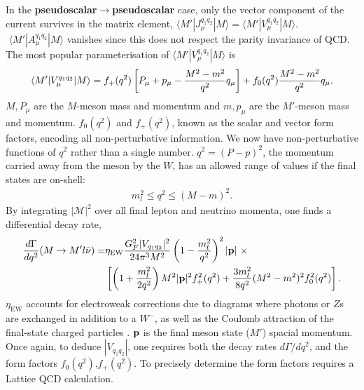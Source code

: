 In the {\bf{pseudoscalar$\to$pseudoscalar}} case, only the vector component of the current survives in the matrix element, $\langle M' | J_{\mu}^{q_1q_2} | M \rangle = \langle M' | V_{\mu}^{q_1q_2} | M \rangle$. $\,\,\langle M' | A_{\mu}^{q_1q_2} | M \rangle$ vanishes since this does not respect the parity invariance of QCD. The most popular parameterisation of $\langle M' | V_{\mu}^{q_1q_2} | M \rangle$ is
\begin{align}
  \langle M' | V_{\mu}^{q_1q_2} | M \rangle = f_+(q^2) \left[ P_{\mu} + p_{\mu} - {M^2-m^2\over q^2} q_{\mu} \right]  + f_0(q^2) {M^2-m^2\over q^2} q_{\mu}.
  \label{eq:formfactors_experimental}
\end{align}
$M,P_{\mu}$ are the $M$-meson mass and momentum and $m,p_{\mu}$ are the $M'$-meson mass and momentum. $f_0(q^2)$ and $f_+(q^2)$, known as the scalar and vector form factors, encoding all non-perturbative information. We now have non-perturbative functions of $q^2$ rather than a single number. $q^2=(P-p)^2$, the momentum carried away from the meson by the $W$, has an allowed range of values if the final states are on-shell:
\begin{align}
  m_l^2 \leq q^2 \leq (M-m)^2.
\end{align}
By integrating $|\mathcal{M}|^2$ over all final lepton and neutrino momenta, one finds a differential decay rate,
\begin{align}
  {d\Gamma\over dq^2}(M\to M'l\bar{\nu}) =& \eta_{\text{EW}} { G_F^2 |V_{q_1q_2}|^2\over 24 \pi^3 M^2 } \left( 1 - {m_l^2\over q^2}\right)^2 |{\bf{p}}| \,\,\times \\
  \label{eq:branchingfraction}
  &\left[ \left( 1 + {m_l^2\over 2q^2}\right) M^2 |{\bf{p}}|^2 f_+^2(q^2) + {3m_l^2\over 8q^2} (M^2-m^2)^2 f_0^2(q^2) \right]. \nonumber
\end{align}
${\eta}_{\text{EW}}$ accounts for electroweak corrections due to diagrams where photons or $Z$s are exchanged in addition to a $W^-$, as well as the Coulomb attraction of the final-state charged particles \cite{SIRLIN198283,Ginsberg1968,PhysRevD.41.1736}. ${\bf{p}}$ is the final meson state ($M'$) spacial momentum. Once again, to deduce $|V_{q_1q_2}|$, one requires both the decay rates $d\Gamma/dq^2$, and the form factors $f_0(q^2)$,$f_+(q^2)$. To precisely determine the form factors requires a Lattice QCD calculation.

